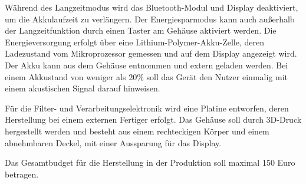 Während des Langzeitmodus wird das Bluetooth-Modul und Display deaktiviert, um die Akkulaufzeit zu verlängern. Der Energiesparmodus kann auch außerhalb der Langzeitfunktion durch einen Taster am Gehäuse aktiviert werden. Die Energieversorgung erfolgt über eine Lithium-Polymer-Akku-Zelle, deren Ladezustand vom Mikroprozessor gemessen und auf dem Display angezeigt wird. Der Akku kann aus dem Gehäuse entnommen und extern geladen werden. Bei einem Akkustand von weniger als 20\% soll das Gerät den Nutzer einmalig mit einem akustischen Signal darauf hinweisen. 

Für die Filter- und Verarbeitungselektronik wird eine Platine entworfen, deren Herstellung bei einem externen Fertiger erfolgt. Das Gehäuse soll durch 3D-Druck hergestellt werden und besteht aus einem rechteckigen Körper und einem abnehmbaren Deckel, mit einer Aussparung für das Display.

Das Gesamtbudget für die Herstellung in der Produktion soll maximal 150 Euro betragen.